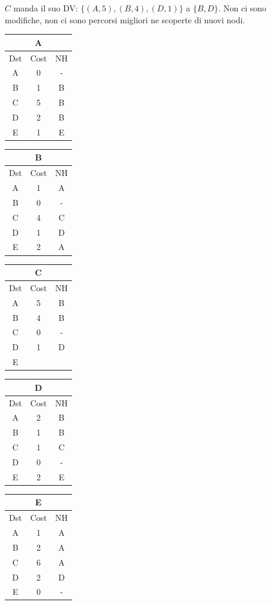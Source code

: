 \documentclass[10pt]{article}
\begin{document}
	\newline \newline
	$C$ manda il suo DV: $\{(A,5),(B,4),(D,1)\}$ a $\{B,D\}$.
	\newline
	Non ci sono modifiche, non ci sono percorsi migliori ne scoperte di nuovi nodi.
	\begin{table}[h!]
		\begin{tabular}{|c||c||c|}
 			\hline
	 		\multicolumn{3}{|c|}{A} \\
 			\hline
 			Dst & Cost & NH\\
 			\hline
 			A & 0 & - \\
 			B & 1 & B \\
 			C & 5 & B \\
 			D & 2 & B \\
 			E & 1 & E \\
 			\hline
		\end{tabular}
		\begin{tabular}{|c||c||c|}
 			\hline
	 		\multicolumn{3}{|c|}{B} \\
 			\hline
 			Dst & Cost & NH\\
 			\hline
 			A & 1 & A \\
 			B & 0 & - \\
 			C & 4 & C  \\
 			D & 1 & D \\
 			E & 2 & A \\
 			\hline
		\end{tabular}
		\begin{tabular}{|c||c||c|}
 			\hline
	 		\multicolumn{3}{|c|}{C} \\
 			\hline
 			Dst & Cost & NH\\
 			\hline
 			A & 5 & B \\
 			B & 4 & B \\
 			C & 0 & - \\
 			D & 1 & D \\
 			E &   &   \\
 			\hline
		\end{tabular}
		\begin{tabular}{|c||c||c|}
 			\hline
	 		\multicolumn{3}{|c|}{D} \\
 			\hline
 			Dst & Cost & NH\\
 			\hline
 			A & 2 & B \\
 			B & 1 & B \\
 			C & 1 & C \\
 			D & 0 & - \\
 			E & 2 & E \\
 			\hline
		\end{tabular}
		\begin{tabular}{|c||c||c|}
 			\hline
	 		\multicolumn{3}{|c|}{E} \\
 			\hline
 			Dst & Cost & NH\\
 			\hline
 			A & 1 & A \\
 			B & 2 & A \\
 			C & 6 & A \\
 			D & 2 & D \\
 			E & 0 & - \\
 			\hline
		\end{tabular}
	\end{table}
\end{document}
